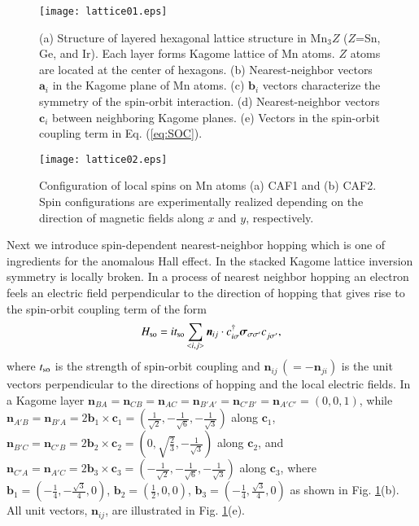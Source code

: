 \documentclass[letter,twocolumn,amsmath,amssymb,superscriptaddress]{jpsj3}
\newcommand{\vs}{\bm{\sigma}}
\newcommand{\va}{\bm{a}}
\newcommand{\vb}{\bm{b}}
\newcommand{\vc}{\bm{c}}
\newcommand{\vn}{\bm{n}}
\begin{document}
\begin{figure}[t]
 \leavevmode\texttt{[image: lattice01.eps]} %
 \caption{
 (a) Structure of layered hexagonal lattice structure in Mn$_3Z$ ($Z$=Sn, Ge, and Ir). Each layer forms Kagome lattice of Mn atoms.  $Z$ atoms are located at the center of hexagons.
(b) Nearest-neighbor vectors $\va_i$ in the Kagome plane of Mn atoms.
(c) $\vb_i$ vectors characterize the symmetry of the spin-orbit interaction. 
(d) Nearest-neighbor vectors $\vc_i$ between neighboring Kagome planes. 
(e) Vectors in the spin-orbit coupling term in Eq. (\ref{eq:SOC}).
}
 \label{fig:lattice01}
\end{figure}





\begin{figure}[b]
 \leavevmode\texttt{[image: lattice02.eps]} %
 \caption{
Configuration of local spins on Mn atoms (a) CAF1 and (b) CAF2. Spin configurations are experimentally realized depending on the direction of magnetic fields along $x$ and $y$, respectively.
 }
 \label{fig:lattice02}
\end{figure}




Next we introduce spin-dependent nearest-neighbor hopping which is one of ingredients for the anomalous Hall effect. 
In the stacked Kagome lattice inversion symmetry is locally broken. In a process of nearest neighbor hopping an electron feels an electric field perpendicular to the direction of hopping that gives rise to the spin-orbit coupling term of the form
\begin{equation}
H_{\rm so}=it_{\rm so}\sum_{<i,j>}\bm{n}_{ij}\cdot c_{i\sigma}^{\dag}\vs_{\sigma\sigma'} c_{j\sigma'}^{},
\label{eq:SOC}
\end{equation}
where $t_{\rm so}$ is the strength of spin-orbit coupling and $\bm{n}_{ij}\, (=-\bm{n}_{ji})$ is the unit vectors perpendicular to the directions of hopping and the local electric fields.
In a Kagome layer $\vn_{BA}=\vn_{CB}=\vn_{AC}
=\vn_{B'A'}=\vn_{C'B'}=\vn_{A'C'}
=(0,0,1)$, 
while $\vn_{A'B}=\vn_{B'A}=2\vb_1\times \vc_{1}=(\frac{1}{\sqrt{2}},-\frac{1}{\sqrt{6}},-\frac{1}{\sqrt{3}})$ along $\vc_1$, 
$\vn_{B'C}=\vn_{C'B}=2\vb_2\times \vc_{2}=(0,\sqrt{\frac{2}{3}},-\frac{1}{\sqrt{3}})$ along $\vc_2$,
and 
$\vn_{C'A}=\vn_{A'C}=2\vb_3\times \vc_{3}=(-\frac{1}{\sqrt{2}},-\frac{1}{\sqrt{6}},-\frac{1}{\sqrt{3}})$ along $\vc_3$,
where
 $\vb_1=(-\frac{1}{4},-\frac{\sqrt{3}}{4},0)$, $\vb_2=(\frac{1}{2},0,0)$, $\vb_3=(-\frac{1}{4},\frac{\sqrt{3}}{4},0)$ as shown in Fig. \ref{fig:lattice01}(b). All unit vectors, ${\bm n}_{ij}$, are illustrated in Fig. \ref{fig:lattice01}(e). 
\end{document}
